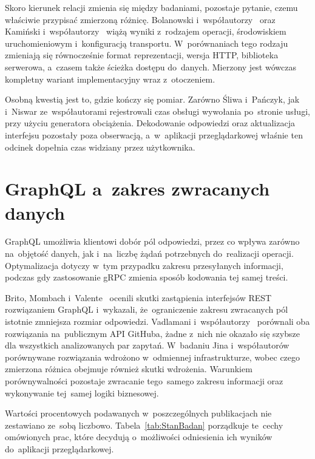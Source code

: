 Skoro kierunek relacji zmienia się między badaniami, pozostaje pytanie, czemu właściwie przypisać zmierzoną różnicę. Bolanowski i~współautorzy~\cite{bib:Bolanowski2022} oraz Kamiński i~współautorzy~\cite{bib:Kaminski2023} wiążą wyniki z~rodzajem operacji, środowiskiem uruchomieniowym i~konfiguracją transportu. W~porównaniach tego rodzaju zmieniają się równocześnie format reprezentacji, wersja HTTP, biblioteka serwerowa, a~czasem także ścieżka dostępu do~danych. Mierzony jest wówczas kompletny wariant implementacyjny wraz z~otoczeniem.

Osobną kwestią jest to, gdzie kończy się pomiar. Zarówno Śliwa i~Pańczyk, jak i~Niswar ze~współautorami rejestrowali czas obsługi wywołania po~stronie usługi, przy użyciu generatora obciążenia. Dekodowanie odpowiedzi oraz aktualizacja interfejsu pozostały poza obserwacją, a~w~aplikacji przeglądarkowej właśnie ten odcinek dopełnia czas widziany przez użytkownika.

\section{GraphQL a~zakres zwracanych danych}
\label{sec:GraphQLPrzeglad}

GraphQL umożliwia klientowi dobór pól odpowiedzi, przez co wpływa zarówno na~objętość danych, jak i~na~liczbę żądań potrzebnych do~realizacji operacji. Optymalizacja dotyczy w~tym przypadku zakresu przesyłanych informacji, podczas gdy zastosowanie gRPC zmienia sposób kodowania tej samej treści.

Brito, Mombach i~Valente~\cite{bib:Brito2019} ocenili skutki zastąpienia interfejsów REST rozwiązaniem GraphQL i~wykazali, że~ograniczenie zakresu zwracanych pól istotnie zmniejsza rozmiar odpowiedzi. Vadlamani i~współautorzy~\cite{bib:Vadlamani2021} porównali oba rozwiązania na~publicznym API GitHuba, żadne z~nich nie okazało się szybsze dla wszystkich analizowanych par zapytań. W~badaniu Jina i~współautorów~\cite{bib:Jin2025} porównywane rozwiązania wdrożono w~odmiennej infrastrukturze, wobec czego zmierzona różnica obejmuje również skutki wdrożenia. Warunkiem porównywalności pozostaje zwracanie tego~samego zakresu informacji oraz wykonywanie tej~samej logiki biznesowej.

Wartości procentowych podawanych w~poszczególnych publikacjach nie zestawiano ze~sobą liczbowo. Tabela~\ref{tab:StanBadan} porządkuje te~cechy omówionych prac, które decydują o~możliwości odniesienia ich wyników do~aplikacji przeglądarkowej.

